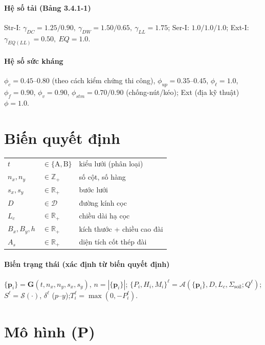 \documentclass[11pt,a4paper]{article}
\newcommand{\Real}{\mathbb{R}}
\newcommand{\Integer}{\mathbb{Z}}
\newcommand{\Anl}{\boldsymbol{\mathcal{A}}}     %
\newcommand{\Stl}{\boldsymbol{\mathcal{S}}}     %
\newcommand{\Gen}{\mathbf{G}}                   %
\newcommand{\Dset}{\mathcal{D}}
\begin{document}
\paragraph{Hệ số tải (Bảng 3.4.1-1)} Str-I: $\gamma_{DC}{=}1.25/0.90,\ \gamma_{DW}{=}1.50/0.65,\ \gamma_{LL}{=}1.75$;
Ser-I: $1.0/1.0/1.0$; Ext-I: $\gamma_{EQ(LL)}{=}0.50,\ EQ{=}1.0$.

\paragraph{Hệ số sức kháng} $\phi_c{=}0.45\text{--}0.80$ (theo cách kiểm chứng thi công),
$\phi_{up}{=}0.35\text{--}0.45$, $\phi_\ell{=}1.0$, $\phi_f{=}0.90$, $\phi_v{=}0.90$,
$\phi_{stm}{=}0.70/0.90$ (chống-nút/kéo); Ext (địa kỹ thuật) $\phi{=}1.0$.

\section{Biến quyết định}
\begin{tabular}{@{}lll@{}}
\toprule
$t$ & $\in\{\mathrm A,\mathrm B\}$ & kiểu lưới (phân loại) \\
$n_x,n_y$ & $\in\Integer_+$ & số cột, số hàng \\
$s_x,s_y$ & $\in\Real_+$ & bước lưới \\
$D$ & $\in\Dset$ & đường kính cọc \\
$L_c$ & $\in\Real_+$ & chiều dài hạ cọc \\
$B_x,B_y,h$ & $\in\Real_+$ & kích thước + chiều cao đài \\
$A_s$ & $\in\Real_+$ & diện tích cốt thép đài \\
\bottomrule
\end{tabular}

\paragraph{Biến trạng thái (xác định từ biến quyết định)}
$\{\mathbf{p}_i\}=\Gen(t,n_x,n_y,s_x,s_y)$, $n=|\{\mathbf{p}_i\}|$;\quad
$\{P_i,H_i,M_i\}^\ell=\Anl(\{\mathbf{p}_i\},D,L_c,\Sigma_{\text{soil}};Q^\ell)$;\quad
$S^\ell=\Stl(\cdot)$, $\delta^\ell$ ($p$--$y$);\quad $T_i^\ell=\max(0,-P_i^\ell)$.

\section{Mô hình (P)}
\end{document}
